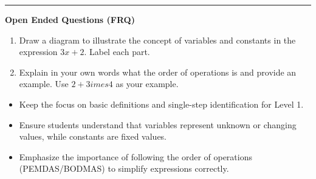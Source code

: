 \documentclass[10pt]{article}
\begin{document}
\vspace{-0.2cm}
\hrule
\vspace{0.2cm}
\textbf{\small Open Ended Questions (FRQ)}
\begin{enumerate}[label=\textbf{Q\arabic*.}, start=9, itemsep=5pt, topsep=0pt]

  \item \small Draw a diagram to illustrate the concept of variables and constants in the expression $3x + 2$. Label each part. \vspace{2cm}

  \item \small Explain in your own words what the order of operations is and provide an example. Use $2 + 3 	imes 4$ as your example. \vspace{2cm}

\end{enumerate}

\vfill

\begin{tcolorbox}[colback=blue!5, colframe=mainblue!50, title=\small \textbf{Chef's Tips}, fonttitle=\bfseries, bottom=1mm]
\begin{itemize}[noitemsep, topsep=2pt, leftmargin=0.5cm]
  \item \scriptsize Keep the focus on basic definitions and single-step identification for Level 1.\item \scriptsize Ensure students understand that variables represent unknown or changing values, while constants are fixed values.\item \scriptsize Emphasize the importance of following the order of operations (PEMDAS/BODMAS) to simplify expressions correctly.
\end{itemize}
\end{tcolorbox}
\end{document}
